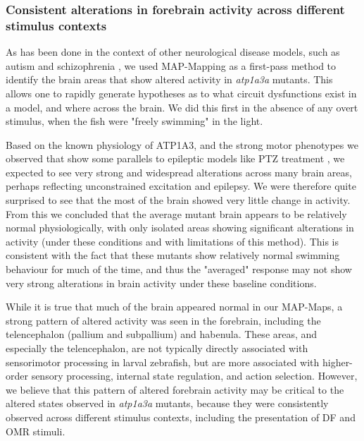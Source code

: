 \documentclass[9.5pt,lineno]{RandlettLab_elife}
\begin{document}
\subsubsection{Consistent alterations in forebrain activity across different stimulus contexts}

As has been done in the context of other neurological disease models, such as autism and schizophrenia \citep{Thyme2019_cell, WeinschutzMendes2023_CR}, we used MAP-Mapping as a first-pass method to identify the brain areas that show altered activity in \emph{atp1a3a} mutants. 
This allows one to rapidly generate hypotheses as to what circuit dysfunctions exist in a model, and where across the brain.
We did this first in the absence of any overt stimulus, when the fish were "freely swimming" in the light. 

Based on the known physiology of ATP1A3, and the strong motor phenotypes we observed that show some parallels to epileptic models like PTZ treatment \citep{Baraban2005_JN}, we expected to see very strong and widespread alterations across many brain areas, perhaps reflecting unconstrained excitation and epilepsy. 
We were therefore quite surprised to see that the most of the brain showed very little change in activity. 
From this we concluded that the average mutant brain appears to be relatively normal physiologically, with only isolated areas showing significant alterations in activity (under these conditions and with limitations of this method). 
This is consistent with the fact that these mutants show relatively normal swimming behaviour for much of the time, and thus the "averaged" response may not show very strong alterations in brain activity under these baseline conditions.

While it is true that much of the brain appeared normal in our MAP-Maps, a strong pattern of altered activity was seen in the forebrain, including the telencephalon (pallium and subpallium) and habenula. 
These areas, and especially the telencephalon, are not typically directly associated with sensorimotor processing in larval zebrafish, but are more associated with higher-order sensory processing, internal state regulation, and action selection.
However, we believe that this pattern of altered forebrain activity may be critical to the altered states observed in \emph{atp1a3a} mutants, because they were consistently observed across different stimulus contexts, including the presentation of DF and OMR stimuli.
\end{document}
